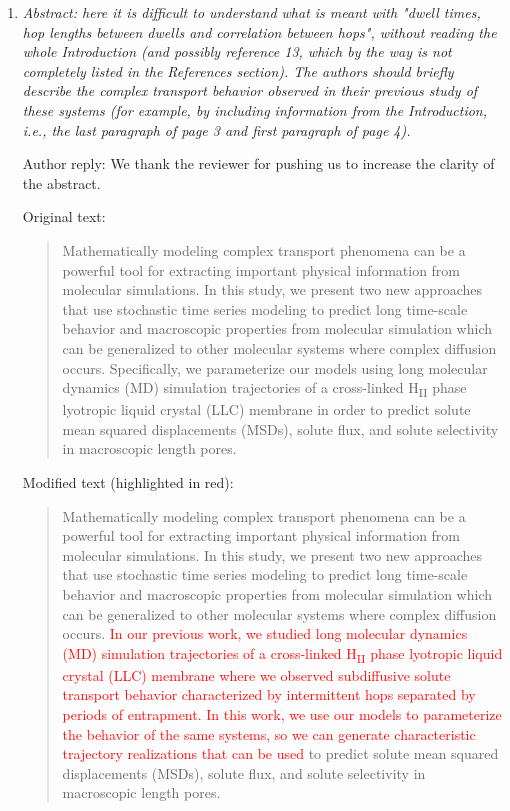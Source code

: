 \documentclass{article}
\begin{document}
\begin{enumerate}[label={Comment \theenumi :}, leftmargin=3.9\parindent]  

    \item \textit{ Abstract: here it is difficult to understand what is meant with "dwell times, hop 
    lengths between dwells and correlation between hops", without reading the whole Introduction (and 
    possibly reference 13, which by the way is not completely listed in the References section). The 
    authors should briefly describe the complex transport behavior observed in their previous study of
    these systems (for example, by including information from the Introduction, i.e., the last paragraph
    of page 3 and first paragraph of page 4).}
    
    Author reply: We thank the reviewer for pushing us to increase the clarity of the abstract. 
    
    Original text:
    
    \begin{quote}
    Mathematically modeling complex transport phenomena can be a powerful tool
    for extracting important physical information from molecular simulations. 
    In this study, we present two new approaches that use stochastic time series
    modeling to predict long time-scale behavior and macroscopic properties 
    from molecular simulation which can be generalized to other molecular systems
    where complex diffusion occurs. Specifically, we parameterize our models using
    long molecular dynamics (MD) simulation trajectories of a cross-linked 
    H\textsubscript{II} phase lyotropic liquid crystal (LLC) membrane in order to
    predict solute mean squared displacements (MSDs), solute flux, and
    solute selectivity in macroscopic length pores.    
    \end{quote}
    
	Modified text (highlighted in red):
	
	\begin{quote}
    Mathematically modeling complex transport phenomena can be a powerful tool
    for extracting important physical information from molecular simulations. 
    In this study, we present two new approaches that use stochastic time series
    modeling to predict long time-scale behavior and macroscopic properties 
    from molecular simulation which can be generalized to other molecular systems
    where complex diffusion occurs. \textcolor{red}{In our previous work, we studied long 
    molecular dynamics (MD) simulation trajectories of a cross-linked 
    H\textsubscript{II} phase lyotropic liquid crystal (LLC) membrane where we
    observed subdiffusive solute transport behavior characterized by intermittent
    hops separated by periods of entrapment. In this work, we use our models to 
    parameterize the behavior of the same systems, so we can generate characteristic
    trajectory realizations that can be used} to predict solute mean squared 
    displacements (MSDs), solute flux, and solute selectivity in macroscopic length pores.
    \end{quote}
  

\end{enumerate}
\end{document}
